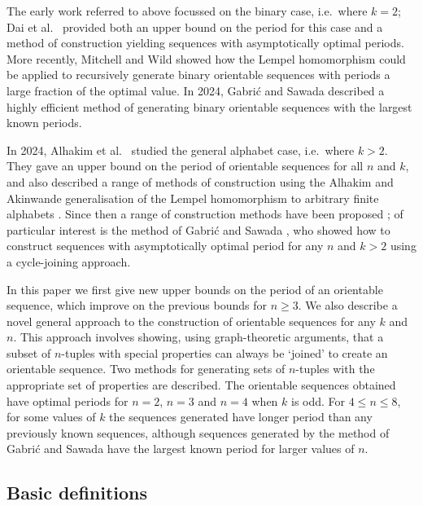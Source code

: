 \documentclass[a4paper,11pt]{article}
\begin{document}
The early work referred to above focussed on the binary case, i.e.\ where $k=2$; Dai et al.\
\cite{Dai93} provided both an upper bound on the period for this case and a method of construction
yielding sequences with asymptotically optimal periods. More recently, Mitchell and Wild
\cite{Mitchell22} showed how the Lempel homomorphism \cite{Lempel70} could be applied to
recursively generate binary orientable sequences with periods a large fraction of the optimal
value.  In 2024, Gabri\'{c} and Sawada \cite{Gabric24,Gabric24b} described a highly efficient
method of generating binary orientable sequences with the largest known periods.

In 2024, Alhakim et al.\ \cite{Alhakim24a} studied the general alphabet case, i.e.\ where $k>2$.
They gave an upper bound on the period of orientable sequences for all $n$ and $k$, and also
described a range of methods of construction using the Alhakim and Akinwande generalisation of the
Lempel homomorphism to arbitrary finite alphabets \cite{Alhakim11}.  Since then a range of
construction methods have been proposed \cite{Gabric25,Mitchell24a,Mitchell25a}; of particular
interest is the method of Gabri\'{c} and Sawada \cite{Gabric25}, who showed how to construct
sequences with asymptotically optimal period for any $n$ and $k>2$ using a cycle-joining approach.

In this paper we first give new upper bounds on the period of an orientable sequence, which improve
on the previous bounds for $n\geq3$. We also describe a novel general approach to the construction
of orientable sequences for any $k$ and $n$. This approach involves showing, using graph-theoretic
arguments, that a subset of $n$-tuples with special properties can always be `joined' to create an
orientable sequence.  Two methods for generating sets of $n$-tuples with the appropriate set of
properties are described. The orientable sequences obtained have optimal periods for $n=2$, $n=3$
and $n=4$ when $k$ is odd. For $4\leq n\leq 8$, for some values of $k$ the sequences generated have
longer period than any previously known sequences, although sequences generated by the method of
Gabri\'{c} and Sawada \cite{Gabric25} have the largest known period for larger values of $n$.


\subsection{Basic definitions}
\end{document}
